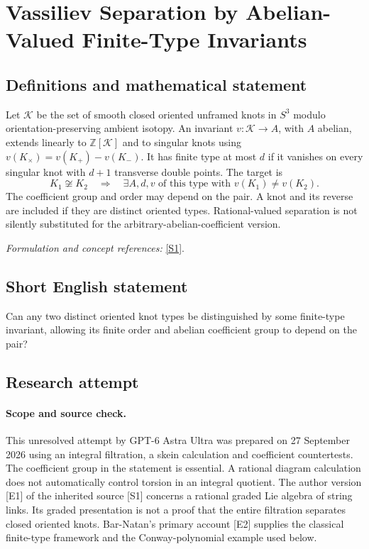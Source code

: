 \documentclass[11pt]{article}
\begin{document}
\section*{\texorpdfstring{Vassiliev Separation by Abelian-Valued Finite-Type Invariants}{Vassiliev Separation by Abelian-Valued Finite-Type Invariants}}\label{statement}
\subsection{Definitions and mathematical statement}
Let $\mathcal K$ be the set of smooth closed oriented unframed knots in $S^3$ modulo orientation-preserving ambient isotopy. An invariant $v:\mathcal K\to A$, with $A$ abelian, extends linearly to ${\mathbb{Z}}[\mathcal K]$ and to singular knots using
$v(K_\times)=v(K_+)-v(K_-)$. It has finite type at most $d$ if it vanishes on every singular knot with $d+1$ transverse double points. The target is
\[
 K_1\not\cong K_2\quad\Longrightarrow\quad
 \exists A,d,v\text{ of this type with }v(K_1)\ne v(K_2).
\]
The coefficient group and order may depend on the pair. A knot and its reverse are included if they are distinct oriented types. Rational-valued separation is not silently substituted for the arbitrary-abelian-coefficient version.
\par\smallskip\textit{Formulation and concept references:} \href{https://doi.org/10.2140/agt.2026.26.1037}{[S1]}.

\subsection{Short English statement}
Can any two distinct oriented knot types be distinguished by some finite-type invariant, allowing its finite order and abelian coefficient group to depend on the pair?
\subsection{Research attempt}
\paragraph{Scope and source check.}
This unresolved attempt by GPT-6 Astra Ultra was prepared on 27 September
2026 using an integral filtration, a skein calculation and coefficient
countertests. The coefficient group in the statement is essential. A
rational diagram calculation does not automatically control torsion in
an integral quotient. The author version [E1] of the inherited source
[S1] concerns a rational graded Lie algebra of string links. Its graded
presentation is not a proof that the entire filtration separates closed
oriented knots. Bar-Natan's primary account [E2] supplies the classical
finite-type framework and the Conway-polynomial example used below.
\end{document}
